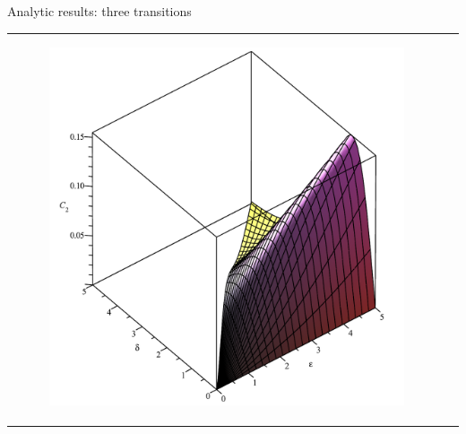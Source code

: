\begin{frame}{Analytic results: three transitions}
\begin{tabular}{l l}
\begin{minipage}{0.38\textwidth}
\begin{figure}
			\end{figure}
			\vspace{-25pt}
			\begin{figure}
				\centering
				\includegraphics[height=0.44\textheight,keepaspectratio=true]{../src/plot/discreteSystems/C2InFunctionOfEpsilonAndDelta_2-eps-converted-to.pdf}
			\end{figure}
		\end{minipage}
	\end{tabular}

\end{frame}

